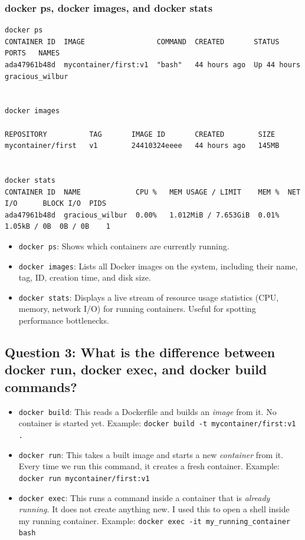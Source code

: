 \documentclass[11pt,a4paper]{article}
\begin{document}
\subsubsection{docker ps, docker images, and docker stats}

\begin{lstlisting}[style=shell, caption={Outputs}]
docker ps
CONTAINER ID  IMAGE                 COMMAND  CREATED       STATUS       PORTS   NAMES
ada47961b48d  mycontainer/first:v1  "bash"   44 hours ago  Up 44 hours          gracious_wilbur


docker images

REPOSITORY          TAG       IMAGE ID       CREATED        SIZE
mycontainer/first   v1        24410324eeee   44 hours ago   145MB


docker stats
CONTAINER ID  NAME             CPU %   MEM USAGE / LIMIT    MEM %  NET I/O      BLOCK I/O  PIDS
ada47961b48d  gracious_wilbur  0.00%   1.012MiB / 7.653GiB  0.01%  1.05kB / 0B  0B / 0B    1
\end{lstlisting}

\begin{itemize}[leftmargin=1.5cm]
  \item \texttt{docker ps}: Shows which containers are currently running.
  \item \texttt{docker images}: Lists all Docker images on the system,
        including their name, tag, ID, creation time, and disk size.
  \item \texttt{docker stats}: Displays a live stream of resource usage
        statistics (CPU, memory, network I/O) for running containers. Useful
        for spotting performance bottlenecks.
\end{itemize}

\subsection{Question 3: What is the difference between docker run, docker exec, and docker build commands?}

\begin{itemize}[leftmargin=1.5cm]
  \item \texttt{docker build}: This reads a Dockerfile and builds an
        \emph{image} from it. No container is started yet. Example:
        \texttt{docker build -t mycontainer/first:v1 .}

  \item \texttt{docker run}: This takes a built image and starts a new
        \emph{container} from it. Every time we run this command, it creates
        a fresh container. Example:
        \texttt{docker run mycontainer/first:v1}

  \item \texttt{docker exec}: This runs a command inside a container that is
        \emph{already running}. It does not create anything new. I used this
        to open a shell inside my running container. Example:
        \texttt{docker exec -it my\_running\_container bash}
\end{itemize}
\end{document}
